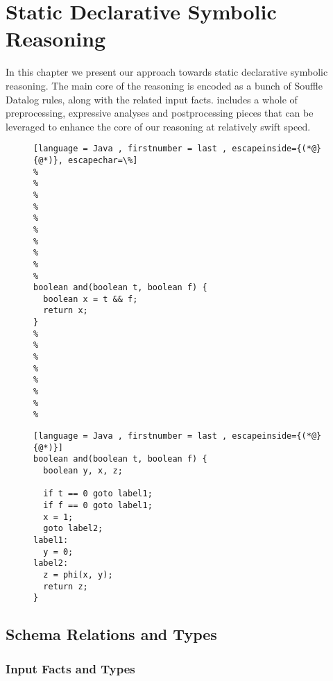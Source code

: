 \chapter{Static Declarative Symbolic Reasoning}\label{c:main-content}

In this chapter we present our approach towards static declarative
symbolic reasoning. The main core of the reasoning is encoded as a
bunch of Souffle Datalog rules, along with the related input facts.
\doop{} includes a whole of preprocessing, expressive analyses and
postprocessing pieces that can be leveraged to enhance the core of
our reasoning at relatively swift speed.

\begin{figure}[th]
  \begin{minipage}{.5\textwidth}
\begin{lstlisting}[language = Java , firstnumber = last , escapeinside={(*@}{@*)}, escapechar=\%]
%
%
%
%
%
%
%
%
%
%
boolean and(boolean t, boolean f) {
  boolean x = t && f;
  return x;
}
%
%
%
%
%
%
%
%

\end{lstlisting}
\label{sc:java-code}
\end{minipage}\hfill
\begin{minipage}{.5\textwidth}
\begin{lstlisting}[language = Java , firstnumber = last , escapeinside={(*@}{@*)}]
boolean and(boolean t, boolean f) {
  boolean y, x, z;

  if t == 0 goto label1;
  if f == 0 goto label1;
  x = 1;
  goto label2;
label1:
  y = 0;
label2:
  z = phi(x, y);
  return z;
}
\end{lstlisting}
\label{sc:soot-code}
\end{minipage}
\end{figure}


\section{Schema Relations and Types}

\subsection{Input Facts and Types}

